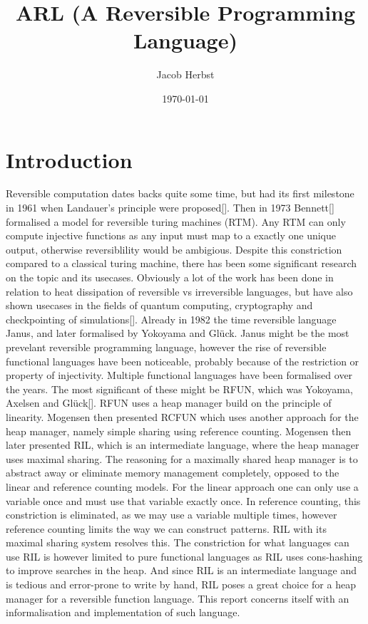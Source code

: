 \documentclass[a4paper]{article}
\author{Jacob Herbst}
\date{\today}
\title{ARL (A Reversible Programming Language)}
\begin{document}
\maketitle

\section{Introduction}
\label{sec:org0293a97}
Reversible computation dates backs quite some time, but had its first milestone in 1961 when Landauer's principle were proposed\ref{}. Then in 1973 Bennett\ref{} formalised a model for reversible turing machines (RTM). Any RTM can only compute injective functions as any input must map to a exactly one unique output, otherwise reversiblility would be ambigious. Despite this constriction compared to a classical turing machine, there has been some significant research on the topic and its usecases. Obviously a lot of the work has been done in relation to heat dissipation of reversible vs irreversible languages, but have also shown usecases in the fields of quantum computing, cryptography and checkpointing of simulations\ref{}. Already in 1982 the time reversible language Janus, and later formalised by Yokoyama and Glück. Janus might be the most prevelant reversible programming language, however the rise of reversible functional languages have been noticeable, probably because of the restriction or property of injectivity. Multiple functional languages have been formalised over the years. The most significant of these might be RFUN, which was Yokoyama, Axelsen and Glück\ref{}. RFUN uses a heap manager build on the principle of linearity. Mogensen then presented RCFUN which uses another approach for the heap manager, namely simple sharing using reference counting. Mogensen then later presented RIL, which is an intermediate language, where the heap manager uses maximal sharing. The reasoning for a maximally shared heap manager is to abstract away or eliminate memory management completely, opposed to the linear and reference counting models. For the linear approach one can only use a variable once and must use that variable exactly once. In reference counting, this constriction is eliminated, as we may use a variable multiple times, however reference counting limits the way we can construct patterns. RIL with its maximal sharing system resolves this. The constriction for what languages can use RIL is however limited to pure functional languages as RIL uses cons-hashing to improve searches in the heap. And since RIL is an intermediate language and is tedious and error-prone to write by hand, RIL poses a great choice for a heap manager for a reversible function language. This report concerns itself with an informalisation and implementation of such language.
\end{document}
